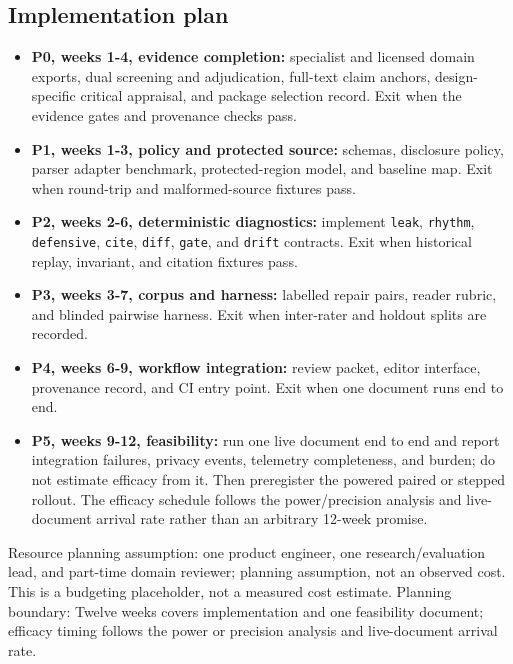 \documentclass[11pt]{article}
\providecommand{\tightlist}{\setlength{\itemsep}{0pt}\setlength{\parskip}{0pt}}
\begin{document}
\hypertarget{implementation-plan}{%
\subsection{Implementation plan}\label{implementation-plan}}

\begin{itemize}
\tightlist
\item
  \textbf{P0, weeks 1-4, evidence completion:} specialist and licensed domain exports, dual screening and adjudication, full-text claim anchors, design-specific critical appraisal, and package selection record. Exit when the evidence gates and provenance checks pass.
\item
  \textbf{P1, weeks 1-3, policy and protected source:} schemas, disclosure policy, parser adapter benchmark, protected-region model, and baseline map. Exit when round-trip and malformed-source fixtures pass.
\item
  \textbf{P2, weeks 2-6, deterministic diagnostics:} implement \texttt{leak}, \texttt{rhythm}, \texttt{defensive}, \texttt{cite}, \texttt{diff}, \texttt{gate}, and \texttt{drift} contracts. Exit when historical replay, invariant, and citation fixtures pass.
\item
  \textbf{P3, weeks 3-7, corpus and harness:} labelled repair pairs, reader rubric, and blinded pairwise harness. Exit when inter-rater and holdout splits are recorded.
\item
  \textbf{P4, weeks 6-9, workflow integration:} review packet, editor interface, provenance record, and CI entry point. Exit when one document runs end to end.
\item
  \textbf{P5, weeks 9-12, feasibility:} run one live document end to end and report integration failures, privacy events, telemetry completeness, and burden; do not estimate efficacy from it. Then preregister the powered paired or stepped rollout. The efficacy schedule follows the power/precision analysis and live-document arrival rate rather than an arbitrary 12-week promise.
\end{itemize}

Resource planning assumption: one product engineer, one research/evaluation lead, and part-time domain reviewer; planning assumption, not an observed cost. This is a budgeting placeholder, not a measured cost estimate. Planning boundary: Twelve weeks covers implementation and one feasibility document; efficacy timing follows the power or precision analysis and live-document arrival rate.
\end{document}
